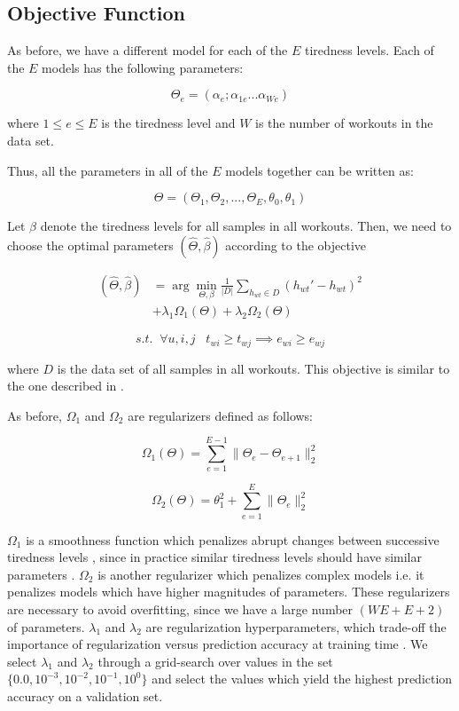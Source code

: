 \documentclass{acm_proc_article-sp}
\begin{document}
\subsection{Objective Function}
As before, we have a different model for each of the $E$ tiredness levels. Each of the $E$ models has the following parameters:

$$\Theta_e = (\alpha_e; \alpha_{1e}...\alpha_{We})$$

where $1 \leq e \leq E$ is the tiredness level and $W$ is the number of workouts in the data set.

Thus, all the parameters in all of the $E$ models together can be written as:

$$\Theta = (\Theta_1, \Theta_2,..., \Theta_E, \theta_0, \theta_1)$$

Let $\beta$ denote the tiredness levels for all samples in all workouts. Then, we need to choose the optimal parameters $(\hat{\Theta}, \hat{\beta})$ according to the objective

\begin{align}
\label{eqnObjective2}
(\hat{\Theta}, \hat{\beta})  &= \arg\min_{\Theta,\beta}\frac{1}{|D|} \sum_{h_{wt} \in D}(h_{wt}' - h_{wt})^2 \nonumber \\
 & + \lambda_1\Omega_1(\Theta) + \lambda_2\Omega_2(\Theta)
\end{align}

$$  s.t. \; \; \forall u,i,j \; \; \;  t_{wi} \geq t_{wj} \implies e_{wi} \geq e_{wj} $$

where $D$ is the data set of all samples in all workouts. This objective is similar to the one described in \cite{www13}.

As before, $\Omega_1$ and $\Omega_2$ are regularizers defined as follows:

$$\Omega_1(\Theta) = \sum_{e=1}^{E-1}{\|\Theta_e - \Theta_{e+1}\|_2^2}$$

$$\Omega_2(\Theta) = \theta_1^2 + \sum_{e=1}^{E}{\|\Theta_e \|_2^2}$$

$\Omega_1$ is a smoothness function which penalizes abrupt changes between successive tiredness levels \cite{www13}, since in practice similar tiredness levels should have similar parameters \cite{www13}. $\Omega_2$ is another regularizer which penalizes complex models i.e. it penalizes models which have higher magnitudes of parameters. These regularizers are necessary to avoid overfitting, since we have a large number $(WE + E + 2)$ of parameters. $\lambda_1$ and $\lambda_2$ are regularization hyperparameters, which trade-off the importance of regularization versus prediction accuracy at training time \cite{www13}. We select $\lambda_1$ and $\lambda_2$ through a grid-search over values in the set $\{0.0, 10^{-3}, 10^{-2}, 10^{-1}, 10^0\}$ and select the values which yield the highest prediction accuracy on a validation set.
\end{document}
